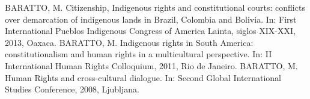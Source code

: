 %


\begin{cvcitems}
  \cvcitem
      {BARATTO, M.}
      {Citizenship, Indigenous rights and constitutional courts: conflicts over demarcation of indigenous lands in Brazil, Colombia and Bolivia. In: First International Pueblos Indigenous Congress of America Lainta, siglos XIX-XXI, 2013, Oaxaca.}
  \cvcitem
      {BARATTO, M.}
      {Indigenous rights in South America: constitutionalism and human rights in a multicultural perspective. In: II International Human Rights Colloquium, 2011, Rio de Janeiro.}
  \cvcitem
      {BARATTO, M.}
      {Human Rights and cross-cultural dialogue. In: Second Global International Studies Conference, 2008, Ljubljana.}
\end{cvcitems}

%

